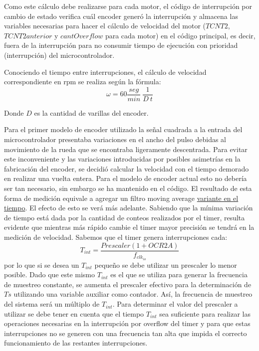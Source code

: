 \documentclass[10pt,conference,a4paper,onecolumn]{article}%
\begin{document}
Como este cálculo debe realizarse para cada motor, el código de interrupción por cambio de estado verifica cuál encoder generó la interrupción y almacena las variables necesarias para hacer el cálculo de velocidad del motor ($TCNT2$, $TCNT2anterior$ y $cantOverflow$ para cada motor) en el código principal, es decir, fuera de la interrupción para no consumir tiempo de ejecución con prioridad (interrupción) del microcontrolador.

Conociendo el tiempo entre interrupciones, el cálculo de velocidad correspondiente en rpm se realiza según la fórmula:
\begin{equation*}
\omega=60 \frac{seg}{min}\ \frac{1}{D\ t}
\end{equation*}

Donde $D$ es la cantidad de varillas del encoder. 

Para el primer modelo de encoder utilizado la señal cuadrada a la entrada del microcontrolador presentaba variaciones en el ancho del pulso debidas al movimiento de la rueda que se encontraba ligeramente descentrada. Para evitar este inconveniente y las variaciones introducidas por posibles asimetrías en la fabricación del encoder,
se decidió calcular la velocidad con el tiempo demorado en realizar una vuelta entera. Para el modelo de encoder actual esto no debería ser tan necesario, sin embargo se ha mantenido en el código. El resultado de esta forma de medición equivale a agregar un filtro moving average \underline{ variante en el tiempo}. El efecto de esto se verá más
adelante.
Sabiendo que la mínima variación de tiempo está dada por la cantidad de conteos realizados por el timer, resulta evidente que mientras más rápido cambie el timer mayor precisión se tendrá en la medición de velocidad.
Sabemos que el timer genera interrupciones cada:
\begin{equation}
T_{int}=\frac{Prescaler(1+OCR2A)}{f_{clk_{io}}}
\end{equation}
por lo que si se desea un $T_{int}$ pequeño se debe utilizar un prescaler lo menor posible. Dado que este mismo $T_{int}$ es el que se utiliza para generar la frecuencia de muestreo constante, se aumenta el prescaler efectivo para la determinación de $Ts$ utilizando una variable auxiliar como contador. Así, la frecuencia de muestreo del sistema será un múltiplo de $T_{int}$. Para determinar el valor del prescaler a utilizar se debe tener en cuenta que el tiempo $T_{int}$ sea suficiente para realizar las operaciones necesarias en la interrupción por overflow del timer y para que estas interrupciones no se generen con una frecuencia tan alta que impida el correcto funcionamiento de las restantes interrupciones.
\end{document}
